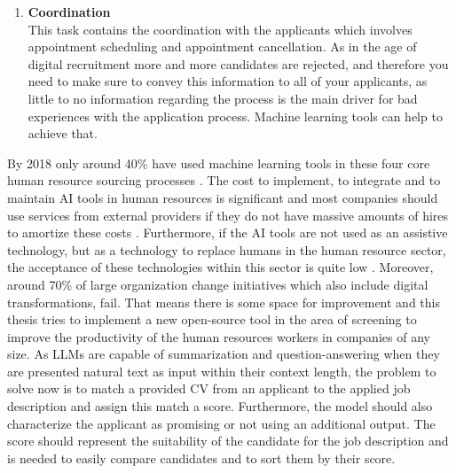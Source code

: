 \documentclass[draft,final]{thesisclass} %
\begin{document}
\begin{enumerate}
    \item \textbf{Coordination}\\
    This task contains the coordination with the applicants which involves appointment scheduling and appointment cancellation. As in the age of digital recruitment more and more candidates are rejected, and therefore you need to make sure to convey this information to all of your applicants, as little to no information regarding the process is the main driver for bad experiences with the application process. Machine learning tools can help to achieve that.
\end{enumerate}
By 2018 only around 40\% have used machine learning tools in these four core human resource sourcing processes \parencite[4]{ai_recruiting}.
The cost to implement, to integrate and to maintain \acs{AI} tools in human resources is significant and most companies should use services from external providers if they do not have massive amounts of hires to amortize these costs \parencite[8]{ai_recruiting}.
Furthermore, if the \acs{AI} tools are not used as an assistive technology, but as a technology to replace humans in the human resource sector, the acceptance of these technologies within this sector is quite low \parencite[9]{ai_recruiting}.
Moreover, around 70\% of large organization change initiatives which also include digital transformations, fail.
That means there is some space for improvement and this thesis tries to implement a new open-source tool in the area of screening to improve the productivity of the human resources workers in companies of any size.
As \acs{LLM}s are capable of summarization and question-answering when they are presented natural text as input within their context length, the problem to solve now is to match a provided \acs{CV} from an applicant to the applied job description and assign this match a score.
Furthermore, the model should also characterize the applicant as promising or not using an additional output.
The score should represent the suitability of the candidate for the job description and is needed to easily compare candidates and to sort them by their score.
\end{document}
